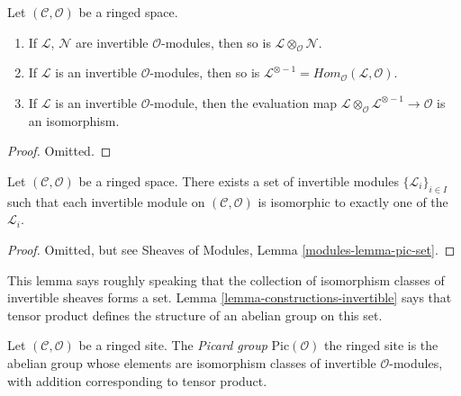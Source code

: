 \begin{lemma}
\label{lemma-constructions-invertible}
Let $(\mathcal{C}, \mathcal{O})$ be a ringed space.
\begin{enumerate}
\item If $\mathcal{L}$, $\mathcal{N}$ are invertible
$\mathcal{O}$-modules, then so is
$\mathcal{L} \otimes_\mathcal{O} \mathcal{N}$.
\item If $\mathcal{L}$ is an invertible
$\mathcal{O}$-modules, then so is
$\mathcal{L}^{\otimes -1}
= \textit{Hom}_\mathcal{O}(\mathcal{L}, \mathcal{O})$.
\item If $\mathcal{L}$ is an invertible
$\mathcal{O}$-module, then the evaluation map
$\mathcal{L} \otimes_\mathcal{O} \mathcal{L}^{\otimes -1}
\to \mathcal{O}$ is an isomorphism.
\end{enumerate}
\end{lemma}

\begin{proof}
Omitted.
\end{proof}

\begin{lemma}
\label{lemma-pic-set}
Let $(\mathcal{C}, \mathcal{O})$ be a ringed space.
There exists a set of invertible modules $\{\mathcal{L}_i\}_{i \in I}$
such that each invertible module on $(\mathcal{C}, \mathcal{O})$
is isomorphic to exactly one of the $\mathcal{L}_i$.
\end{lemma}

\begin{proof}
Omitted, but see Sheaves of Modules, Lemma \ref{modules-lemma-pic-set}.
\end{proof}

\noindent
This lemma says roughly speaking that the collection of
isomorphism classes of invertible sheaves forms a set.
Lemma \ref{lemma-constructions-invertible} says that
tensor product defines the structure of an abelian group
on this set.

\begin{definition}
\label{definition-pic}
Let $(\mathcal{C}, \mathcal{O})$ be a ringed site.
The {\it Picard group} $\text{Pic}(\mathcal{O})$
the ringed site is the
abelian group whose elements are isomorphism classes of
invertible $\mathcal{O}$-modules, with addition
corresponding to tensor product.
\end{definition}









